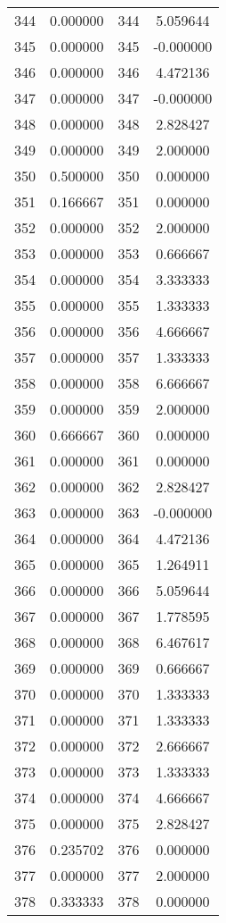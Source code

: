 \documentclass[12pt]{article}
\begin{document}
\begin{longtable}{@{}cccc@{}}
344 & 0.000000 & 344 & 5.059644 \\
345 & 0.000000 & 345 & -0.000000 \\
346 & 0.000000 & 346 & 4.472136 \\
347 & 0.000000 & 347 & -0.000000 \\
348 & 0.000000 & 348 & 2.828427 \\
349 & 0.000000 & 349 & 2.000000 \\
350 & 0.500000 & 350 & 0.000000 \\
351 & 0.166667 & 351 & 0.000000 \\
352 & 0.000000 & 352 & 2.000000 \\
353 & 0.000000 & 353 & 0.666667 \\
354 & 0.000000 & 354 & 3.333333 \\
355 & 0.000000 & 355 & 1.333333 \\
356 & 0.000000 & 356 & 4.666667 \\
357 & 0.000000 & 357 & 1.333333 \\
358 & 0.000000 & 358 & 6.666667 \\
359 & 0.000000 & 359 & 2.000000 \\
360 & 0.666667 & 360 & 0.000000 \\
361 & 0.000000 & 361 & 0.000000 \\
362 & 0.000000 & 362 & 2.828427 \\
363 & 0.000000 & 363 & -0.000000 \\
364 & 0.000000 & 364 & 4.472136 \\
365 & 0.000000 & 365 & 1.264911 \\
366 & 0.000000 & 366 & 5.059644 \\
367 & 0.000000 & 367 & 1.778595 \\
368 & 0.000000 & 368 & 6.467617 \\
369 & 0.000000 & 369 & 0.666667 \\
370 & 0.000000 & 370 & 1.333333 \\
371 & 0.000000 & 371 & 1.333333 \\
372 & 0.000000 & 372 & 2.666667 \\
373 & 0.000000 & 373 & 1.333333 \\
374 & 0.000000 & 374 & 4.666667 \\
375 & 0.000000 & 375 & 2.828427 \\
376 & 0.235702 & 376 & 0.000000 \\
377 & 0.000000 & 377 & 2.000000 \\
378 & 0.333333 & 378 & 0.000000 \\

\end{longtable}
\end{document}
